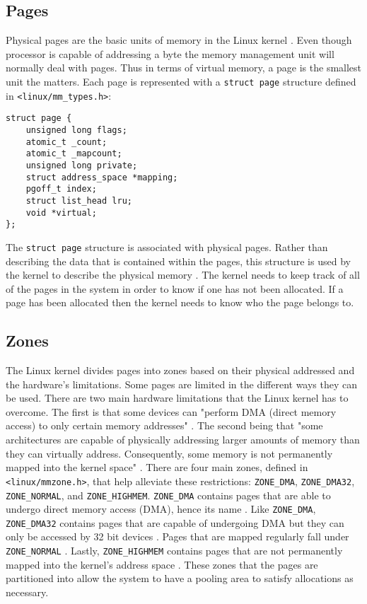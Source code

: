 \subsection{Pages}
Physical pages are the basic units of memory in the Linux kernel \cite{LinuxTextbook}. Even though processor is capable of addressing a byte the memory management unit will normally deal with pages\cite{LinuxTextbook}. Thus in terms of virtual memory, a page is the smallest unit the matters. Each page is represented with a \lstinline{struct page} structure defined in \lstinline{<linux/mm_types.h>}:
\begin{lstlisting}
struct page {
    unsigned long flags;
    atomic_t _count;
    atomic_t _mapcount;
    unsigned long private;
    struct address_space *mapping;
    pgoff_t index;
    struct list_head lru;
    void *virtual;
};
\end{lstlisting}
The \lstinline{struct page} structure is associated with physical pages. Rather than describing the data that is contained within the pages, this structure is used by the kernel to describe the physical memory \cite{LinuxTextbook}. The kernel needs to keep track of all of the pages in the system in order to know if one has not been allocated. If a page has been allocated then the kernel needs to know who the page belongs to. 

\subsection{Zones}
The Linux kernel divides pages into zones based on their physical addressed and the hardware's limitations. Some pages are limited in the different ways they can be used. There are two main hardware limitations that the Linux kernel has to overcome. The first is that some devices can "perform DMA (direct memory access) to only certain memory addresses" \cite{LinuxTextbook}. The second being that "some architectures are capable of physically addressing larger amounts of memory than they can virtually address. Consequently, some memory is not permanently mapped into the kernel space" \cite{LinuxTextbook}. There are four main zones, defined in \lstinline{<linux/mmzone.h>}, that help alleviate these restrictions: \lstinline{ZONE_DMA}, \lstinline{ZONE_DMA32}, \lstinline{ZONE_NORMAL}, and \lstinline{ZONE_HIGHMEM}. \lstinline{ZONE_DMA} contains pages that are able to undergo direct memory access (DMA), hence its name \cite{LinuxTextbook}. Like \lstinline{ZONE_DMA}, \lstinline{ZONE_DMA32}  contains pages that are capable of undergoing DMA but they can only be accessed by 32 bit devices \cite{LinuxTextbook}. Pages that are mapped regularly fall under \lstinline{ZONE_NORMAL} \cite{LinuxTextbook}. Lastly, \lstinline{ZONE_HIGHMEM} contains pages that are not permanently mapped into the kernel's address space \cite{LinuxTextbook}. These zones that the pages are partitioned into allow the system to have a pooling area to satisfy allocations as necessary.

